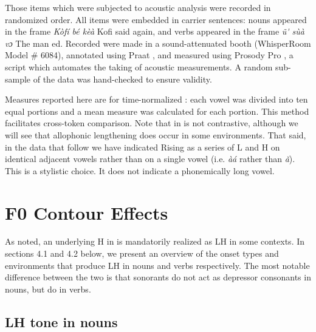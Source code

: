 \documentclass[output=paper
,newtxmath
,modfonts
,nonflat]{langsci/langscibook}
\begin{document}
Those items which were subjected to acoustic analysis were recorded in randomized order. All items were embedded in carrier sentences: nouns appeared in the frame \textit{Kòfí bé \underline{ }\underline{ }\underline{ }\underline{ } kèà} {\textquotedbl}Kofi said \underline{ }\underline{ }\underline{ }\underline{ } again,{\textquotedbl} and verbs appeared in the frame  \textit{ũ\'{} sùà \underline{ }\underline{ }\underline{ }\underline{ } vɔ} {\textquotedbl}The man \underline{ }\underline{ }\underline{ }\underline{ }\underline{ }\underline{ }ed.{\textquotedbl} Recorded were made in a sound-attenuated booth (WhisperRoom Model \# 6084), annotated using Praat \citep{Boersma2016}, and measured using Prosody Pro \citep{xu2013prosodypro}, a script which automates the taking of acoustic measurements. A random sub-sample of the data was hand-checked to ensure validity. 

Measures reported here are for time-normalized : each vowel was divided into ten equal portions and a mean  measure was calculated for each portion. This method facilitates cross-token comparison. Note that  in  is not contrastive, although we will see that allophonic lengthening does occur in some environments. That said, in the data that follow we have indicated Rising  as a series of L and H on identical adjacent vowels rather than on a single vowel (i.e. \textit{àá} rather than \textit{ǎ}). This is a stylistic choice. It does not indicate a phonemically long vowel.

\section{F0 Contour Effects}\label{sec:lotven:4}

As noted, an underlying H  in  is mandatorily realized as LH in some contexts. In sections 4.1 and 4.2 below, we present an overview of the onset types and environments that produce LH  in nouns and verbs respectively. The most notable difference between the two is that sonorants do not act as depressor consonants in nouns, but do in verbs. 

\subsection{LH tone in nouns} \label{sec:lotven:4.1}
\end{document}
